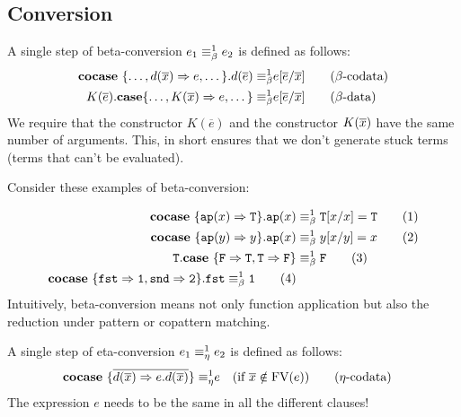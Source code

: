 \documentclass[twoside,12pt,a4paper]{article}
\begin{document}
\subsection{Conversion}

\begin{definition} \label{sec:betaconv}
    A single step of beta-conversion $e_1 \equiv_{\beta}^1 e_2$ is defined as follows:
    \begin{align*}
        \textbf{cocase}\ \{\dots,d(\overline{x}) \Rightarrow e, \dots\}.d(\overline{e})
        \equiv_{\beta}^1 & e[\overline{e}/\overline{x}]  
        \tag{$\beta$-codata}\\
        K(\overline{e}).\textbf{case}\{\dots,K(\overline{x})\Rightarrow e,\dots\}
        \equiv_{\beta}^1 & e[\overline{e}/\overline{x}] 
        \tag{$\beta$-data}
    \end{align*}
    We require that the constructor $K(\overline{e})$ and the constructor $K(\overline{x})$ have the same number of arguments.
    This, in short ensures that we don't generate stuck terms (terms that can't be evaluated).
\end{definition}
Consider these examples of beta-conversion:
\begin{example}
    \begin{align*}
        \textbf{cocase}\ \{\texttt{ap}(x)\Rightarrow \mathtt{T}\}.\texttt{ap}(x)&\equiv_{\beta}^1 \mathtt{T}[x/x] = \mathtt{T} 
        \tag{1}\\
        \textbf{cocase}\ \{\texttt{ap}(y)\Rightarrow y\}.\texttt{ap}(x) &\equiv_{\beta}^1 y[x/y]= x
        \tag{2}\\
        \mathtt{T}.\textbf{case}\ \{\mathtt{F}\Rightarrow \mathtt{T}, \mathtt{T} \Rightarrow \mathtt{F}\}&\equiv_{\beta}^1\mathtt{F}
        \tag{3}\\
        \textbf{cocase}\ \{\mathtt{fst\Rightarrow 1, snd\Rightarrow 2}\}.\mathtt{fst}\equiv_{\beta}^1 \mathtt{1}
        \tag{4}
    \end{align*}
    Intuitively, beta-conversion means not only function application but also the reduction under pattern or copattern matching.
\end{example}

\begin{definition}
    A single step of eta-conversion $e_1 \equiv_{\eta}^1 e_2$ is defined as follows:
    \begin{align*}
        \textbf{cocase}\ \{\overline{d(\overline{x})\Rightarrow e.d(\overline{x})}\}
        \equiv_{\eta}^1 & e \quad (\text{if } \overline{x}\notin \text{FV}(e)) \tag{$\eta$-codata}
    \end{align*}
    The expression $e$ needs to be the same in all the different clauses!
\end{definition}
\end{document}
